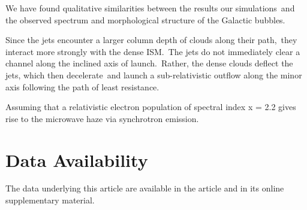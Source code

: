 \documentclass[twocolumn]{aastex631}
\begin{document}
We have found qualitative similarities between the results our simulations\
and the observed spectrum and morphological structure of the Galactic bubbles.


Since the jets encounter a larger column depth of clouds along their path,\
they interact more strongly with the dense ISM.\
The jets do not immediately clear a channel along the inclined axis of launch.\
Rather, the dense clouds deflect the jets, which then decelerate\
and launch a sub-relativistic outflow along the minor axis following the path of least resistance.

Assuming that a relativistic electron population of spectral
index x = 2.2 gives rise to the microwave haze via synchrotron
emission.




\section*{Data Availability}
The data underlying this article are available in the article and in its online supplementary material.






\end{document}
